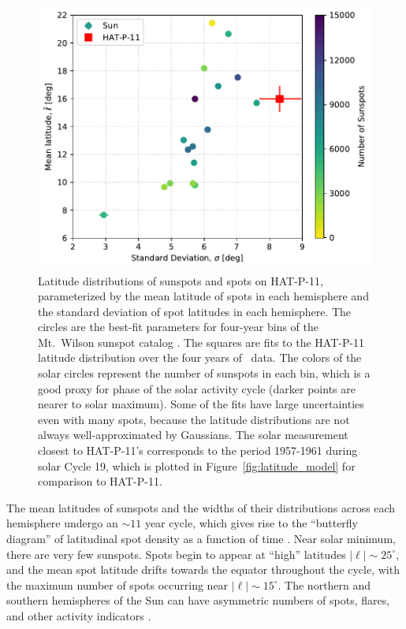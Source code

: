 \begin{figure}
\centering
\includegraphics[scale=0.9]{stsp_hat_p_11/sun_vs_hat11.pdf}
\caption{Latitude distributions of sunspots and spots on HAT-P-11, parameterized by the mean latitude of spots in each hemisphere and the standard deviation of spot latitudes in each hemisphere. The circles are the best-fit parameters for four-year bins of the Mt.~Wilson sunspot catalog \citep{Howard1984}. The squares are fits to the HAT-P-11 latitude distribution over the four years of \kepler\ data. The colors of the solar circles represent the number of sunspots in each bin, which is a good proxy for phase of the solar activity cycle (darker points are nearer to solar maximum). Some of the fits have large uncertainties even with many spots, because the latitude distributions are not always well-approximated by Gaussians. The solar measurement closest to HAT-P-11's corresponds to the period 1957-1961 during solar Cycle 19, which is plotted in Figure~\ref{fig:latitude_model} for comparison to HAT-P-11.}
\label{fig:sun_vs_hat11}
\end{figure}

The mean latitudes of sunspots and the widths of their distributions across each hemisphere undergo an $\sim 11$ year cycle, which gives rise to the ``butterfly diagram'' of latitudinal spot density as a function of time \citep[see for example][]{Hathaway2011, Hathaway2015}. Near solar minimum, there are very few sunspots. Spots begin to appear at ``high'' latitudes $\left | \ell \right |  \sim 25^\circ$, and the mean spot latitude drifts towards the equator throughout the cycle, with the maximum number of spots occurring near $\left | \ell \right | \sim 15^\circ$. The northern and southern hemispheres of the Sun can have asymmetric numbers of spots, flares, and other activity indicators \citep[see for example][]{Newton1955, Vizoso1990, Carbonell1993, Li2002}.

